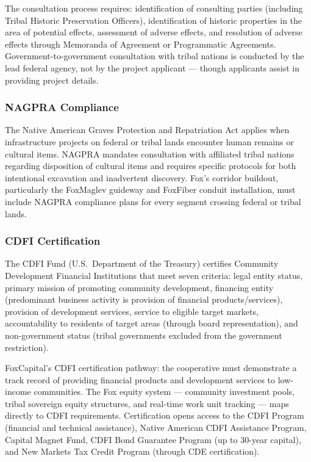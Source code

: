\documentclass[11pt,letterpaper]{article}
\begin{document}
The consultation process requires: identification of consulting parties (including Tribal Historic Preservation Officers), identification of historic properties in the area of potential effects, assessment of adverse effects, and resolution of adverse effects through Memoranda of Agreement or Programmatic Agreements. Government-to-government consultation with tribal nations is conducted by the lead federal agency, not by the project applicant --- though applicants assist in providing project details.

\subsubsection{NAGPRA Compliance}

The Native American Graves Protection and Repatriation Act applies when infrastructure projects on federal or tribal lands encounter human remains or cultural items. NAGPRA mandates consultation with affiliated tribal nations regarding disposition of cultural items and requires specific protocols for both intentional excavation and inadvertent discovery. Fox's corridor buildout, particularly the FoxMaglev guideway and FoxFiber conduit installation, must include NAGPRA compliance plans for every segment crossing federal or tribal lands.

\subsubsection{CDFI Certification}

The CDFI Fund (U.S.\ Department of the Treasury) certifies Community Development Financial Institutions that meet seven criteria: legal entity status, primary mission of promoting community development, financing entity (predominant business activity is provision of financial products/services), provision of development services, service to eligible target markets, accountability to residents of target areas (through board representation), and non-government status (tribal governments excluded from the government restriction).

FoxCapital's CDFI certification pathway: the cooperative must demonstrate a track record of providing financial products and development services to low-income communities. The Fox equity system --- community investment pools, tribal sovereign equity structures, and real-time work unit tracking --- maps directly to CDFI requirements. Certification opens access to the CDFI Program (financial and technical assistance), Native American CDFI Assistance Program, Capital Magnet Fund, CDFI Bond Guarantee Program (up to 30-year capital), and New Markets Tax Credit Program (through CDE certification).
\end{document}
